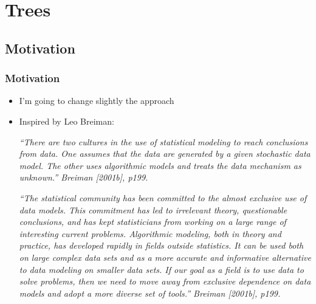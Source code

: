 \documentclass[
  shownotes,
  xcolor={svgnames},
  hyperref={colorlinks,citecolor=DarkBlue,linkcolor=DarkRed,urlcolor=DarkBlue}
  , aspectratio=169]{beamer}
\begin{document}
\section{Trees}
\subsection{Motivation}
\begin{frame}[fragile]
\frametitle{Motivation}

\begin{itemize}
\item I'm going to change slightly the approach
\medskip
\item Inspired by Leo Breiman:

\medskip
{\scriptsize
{\it ``There are two cultures in the use of statistical modeling to reach conclusions from data. One assumes that the data are generated by a given stochastic data model. The other uses algorithmic models and treats the data mechanism as unknown.'' Breiman [2001b], p199.}
\medskip

{\it ``The statistical community has been committed to the almost exclusive use of data models. This commitment has led to irrelevant theory, questionable conclusions, and has kept statisticians from working on a large range of interesting current problems. Algorithmic modeling, both in theory and practice, has developed rapidly in fields outside statistics. It can be used both on large complex data sets and as a more accurate and informative alternative to data modeling on smaller data sets. If our goal as a field is to use data to solve problems, then we need to move away from exclusive dependence on data models and adopt a more diverse set of tools.'' Breiman [2001b], p199.}
}
\end{itemize}


\end{frame}
\end{document}
